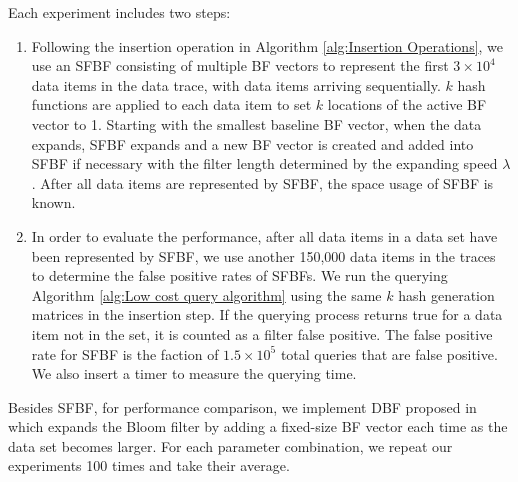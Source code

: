 \documentclass[10pt,journal,letterpaper]{IEEEtran}
\newcommand{\note}[1]{{\sffamily\itshape\bfseries\uline{#1}}}
\begin{document}
Each experiment includes two steps:
\begin{enumerate}

\item Following the insertion operation in Algorithm \ref{alg:Insertion Operations}, we use an SFBF consisting of multiple BF vectors to represent the first $3 \times 10^4$ data items in the data trace, with data items  arriving sequentially.  $k$ hash functions are applied to each data item to set $k$ locations of the active BF vector to 1. Starting with the smallest baseline BF vector, when the data expands, SFBF expands and a new BF vector is created and added into SFBF if necessary with the filter length determined by the expanding speed $\lambda$. 
     After all data items are represented by SFBF, the space usage of SFBF is known.

\item In order to evaluate the performance, after all data items in a data set have been represented by SFBF, we use another 150,000 data items in the traces to determine the false positive rates of SFBFs.  We run the querying Algorithm \ref{alg:Low cost query algorithm} using the same $k$ hash generation matrices in the insertion step. If the querying process returns true for a data item not in the set, it is counted as a filter false positive. The false positive rate for SFBF is the faction of $1.5 \times 10^5$ total queries that are false positive. We also insert a timer to measure the querying time.
\end{enumerate}



Besides SFBF, for performance comparison, we implement DBF proposed in~\cite{guo2006theory} which expands
the Bloom filter by adding a fixed-size BF vector each time as the data set becomes larger.  For each parameter combination, we repeat our experiments 100 times and take their average.
\end{document}
